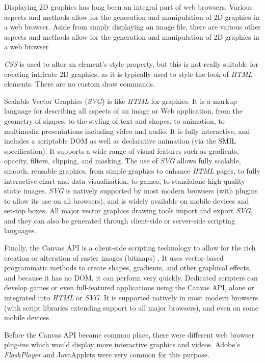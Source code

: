 \documentclass[a4paper,11pt,titlepage]{article}
\begin{document}
Displaying 2D graphics has long been an integral part of web browsers. Various aspects and methods allow for the generation and manipulation of 2D graphics in a web browser. Aside from simply displaying an image file, there are various other aspects and methods allow for the generation and manipulation of 2D graphics in a web browser

\textit{CSS} is used to alter an element's style property, but this is not really suitable for creating intricate 2D graphics, as it is typically used to style the look of \textit{HTML} elements. There are no custom draw commands.

Scalable Vector Graphics (\textit{SVG}) is like \textit{HTML} for graphics\cite{svg}. It is a markup language for describing all aspects of an image or Web application, from the geometry of shapes, to the styling of text and shapes, to animation, to multimedia presentations including video and audio. It is fully interactive, and includes a scriptable DOM as well as declarative animation (via the SMIL specification). It supports a wide range of visual features such as gradients, opacity, filters, clipping, and masking.
The use of \textit{SVG} allows fully scalable, smooth, reusable graphics, from simple graphics to enhance \textit{HTML} pages, to fully interactive chart and data visualization, to games, to standalone high-quality static images. \textit{SVG} is natively supported by most modern browsers (with plugins to allow its use on all browsers), and is widely available on mobile devices and set-top boxes. All major vector graphics drawing tools import and export \textit{SVG}, and they can also be generated through client-side or server-side scripting languages.

Finally, the Canvas API is a client-side scripting technology to allow for the rich creation or alteration of raster images (bitmaps) . It uses vector-based programmatic methods to create shapes, gradients, and other graphical effects, and because it has no DOM, it can perform very quickly. Dedicated scripters can develop games or even full-featured applications using the Canvas API, alone or integrated into \textit{HTML} or \textit{SVG}. It is supported natively in most modern browsers (with script libraries extending support to all major browsers), and even on some mobile devices.

Before the Canvas API became common place, there were different web browser plug-ins which would display more interactive graphics and videos. Adobe's \textit{FlashPlayer} and JavaApplets were very common for this purpose.
\end{document}
